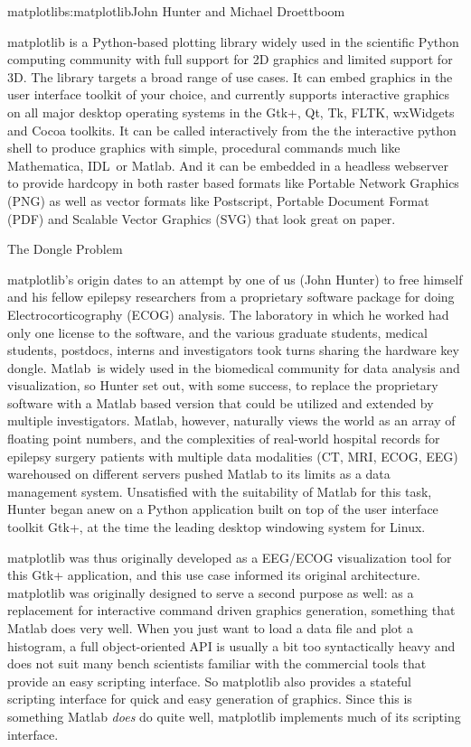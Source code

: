\begin{aosachapter}{matplotlib}{s:matplotlib}{John Hunter and Michael Droettboom}




matplotlib is a Python-based plotting library widely used in the
scientific Python computing community with full support for 2D
graphics and limited support for 3D.  The library targets a broad
range of use cases.  It can embed graphics in the user interface
toolkit of your choice, and currently supports interactive graphics on
all major desktop operating systems in the Gtk+, Qt, Tk, FLTK,
wxWidgets and Cocoa toolkits.  It can be called interactively from the
the interactive python shell to produce graphics with simple,
procedural commands much like Mathematica\texttrademark,
IDL\texttrademark\ or Matlab\texttrademark.  And it can be embedded in
a headless webserver to provide hardcopy in both raster based formats
like Portable Network Graphics (PNG) as well as vector formats like
Postscript, Portable Document Format (PDF) and Scalable Vector
Graphics (SVG) that look great on paper.

\begin{aosasect1}{The Dongle Problem}

matplotlib's origin dates to an attempt by one of us (John Hunter) to
free himself and his fellow epilepsy researchers from a proprietary
software package for doing Electrocorticography (ECOG) analysis.  The
laboratory in which he worked had only one license to the software,
and the various graduate students, medical students, postdocs, interns
and investigators took turns sharing the hardware key dongle.
Matlab\texttrademark\ is widely used in the biomedical community for
data analysis and visualization, so Hunter set out, with some success,
to replace the proprietary software with a Matlab based version that
could be utilized and extended by multiple investigators.  Matlab,
however, naturally views the world as an array of floating point
numbers, and the complexities of real-world hospital records for
epilepsy surgery patients with multiple data modalities (CT, MRI,
ECOG, EEG) warehoused on different servers pushed Matlab to its limits
as a data management system.  Unsatisfied with the suitability of
Matlab for this task, Hunter began anew on a Python application built
on top of the user interface toolkit Gtk+, at the time the leading
desktop windowing system for Linux.

matplotlib was thus originally developed as a EEG/ECOG visualization
tool for this Gtk+ application, and this use case informed its
original architecture.  matplotlib was originally designed to serve a
second purpose as well: as a replacement for interactive command
driven graphics generation, something that Matlab does very well.
When you just want to load a data file and plot a histogram, a full
object-oriented API is usually a bit too syntactically heavy and does
not suit many bench scientists familiar with the commercial tools that
provide an easy scripting interface.  So matplotlib also provides a
stateful scripting interface for quick and easy generation of
graphics.  Since this is something Matlab \emph{does} do quite well,
matplotlib implements much of its scripting interface.


\end{aosasect1}
\end{aosachapter}
